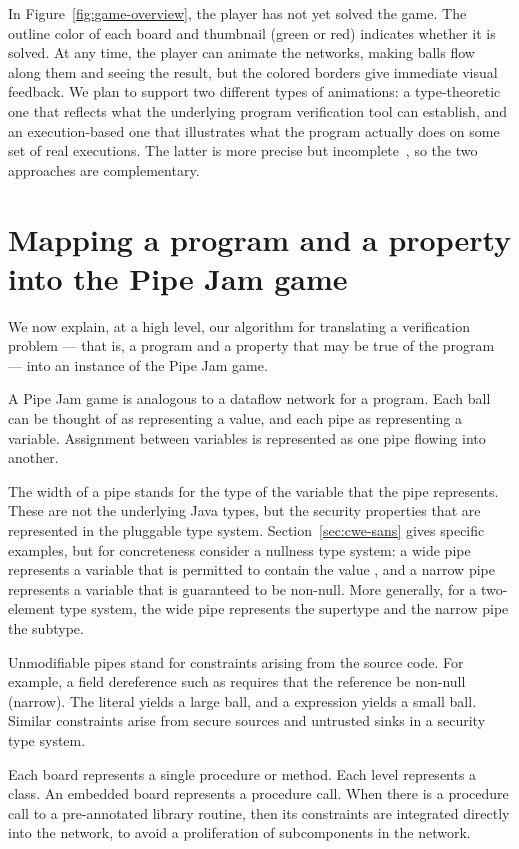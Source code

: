 \documentclass[preprint]{sig-alternate}
\newcommand{\figref}[1]{Figure~\ref{#1}}
\newcommand{\secref}[1]{Section~\ref{#1}}
\def\<#1>{\codeid{#1}}
\newcommand{\codeid}[1]{\ifmmode{\mbox{\ttfamily{#1}}}\else{\ttfamily #1}\fi}
\begin{document}
In \figref{fig:game-overview}, the player has not yet solved the
game.  The outline color of each board and thumbnail (green or red)
indicates whether it is solved.  At any time, the player can animate
the networks, making balls flow along them and seeing the result, but
the colored borders give immediate visual feedback.  We plan to
support two different types of animations: a type-theoretic one that
reflects what the underlying program verification tool can establish,
and an execution-based one that illustrates what the program actually
does on some set of real executions.  The latter is more precise but
incomplete~\cite{Ernst2003:WODA}, so the two approaches are
complementary.


\section{Mapping a program and a property into the Pipe Jam game}

We now explain, at a high level, our algorithm for translating a
verification problem --- that is, a program and a property that may be
true of the program --- into an instance of the Pipe Jam game.

A Pipe Jam game is analogous to a dataflow network for a program.
Each ball can be thought of as representing a value, and each pipe as
representing a variable.  Assignment between variables is represented
as one pipe flowing into another.

The width of a pipe stands for the type of the variable that the pipe
represents.  These are not the underlying Java types, but the security
properties that are represented in the pluggable type system.
\secref{sec:cwe-sans} gives specific examples, but for
concreteness consider a nullness type system: a wide pipe represents a
variable that is permitted to contain the value \<null>, and a narrow
pipe represents a variable that is guaranteed to be non-null.  More
generally, for a two-element type system, the wide pipe represents the
supertype and the narrow pipe the subtype.

Unmodifiable pipes stand for constraints arising from the source code.
For example, a field dereference such as \<x.f> requires that the
reference \<x> be non-null (narrow).  The literal \<null> yields a
large ball, and a \<new> expression yields a small ball.  Similar
constraints arise from secure sources and untrusted sinks in a
security type system.

Each board represents a single procedure or method.  Each level
represents a class.  An embedded board represents a procedure call.
When there is a procedure call to a pre-annotated library routine,
then its constraints are integrated directly into the network, to
avoid a proliferation of subcomponents in the network.
\end{document}
